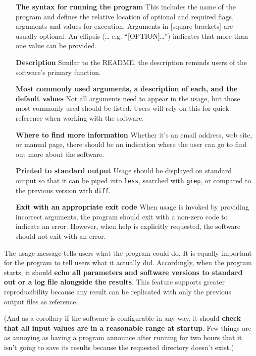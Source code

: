 \documentclass[10pt,letterpaper]{article}
\begin{document}
\begin{itemize}

\item[\textbf{The syntax for running the program}] This includes the
  name of the program and defines the relative location of optional
  and required flags, arguments and values for execution.  Arguments
  in {[}square brackets{]} are usually optional. An ellipsis (\ldots
  e.g. ``{[}OPTION{]}\ldots{}'') indicates that more than one value
  can be provided.

\item[\textbf{Description}] Similar to the README, the description
  reminds users of the software's primary function.

\item[\textbf{Most commonly used arguments, a description of each, and
    the default values}] Not all arguments need to appear in the
  usage, but those most commonly used should be listed. Users will
  rely on this for quick reference when working with the software.

\item[\textbf{Where to find more information}] Whether it's an email
  address, web site, or manual page, there should be an indication
  where the user can go to find out more about the software.

\item[\textbf{Printed to standard output}] Usage should be displayed
  on standard output so that it can be piped into \texttt{less},
  searched with \texttt{grep}, or compared to the previous version
  with \texttt{diff}.

\item[\textbf{Exit with an appropriate exit code}] When usage is
  invoked by providing incorrect arguments, the program should exit
  with a non-zero code to indicate an error. However, when help is
  explicitly requested, the software should not exit with an error.

\end{itemize}

The usage message tells users what the program could do.
It is equally important for the program to tell users what it actually did.
Accordingly,
when the program starts, it should \textbf{echo all parameters and software
versions to standard out or a log file alongside the results}. This
feature supports greater reproducibility because any result can be
replicated with only the previous output files as reference.

(And as a corollary
if the software is configurable in any way,
it should \textbf{check that all input values are in a reasonable range at startup}. 
Few things are as annoying as having a program announce after running for two hours
that it isn't going to save its results
because the requested directory doesn't exist.)
\end{document}
